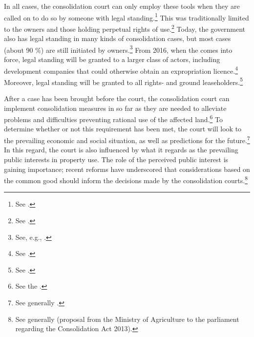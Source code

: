In all cases, the consolidation court can only employ these tools when they are called on to do so by someone with legal standing.\footnote{See \dni\cite[5]{lca79}.} This was traditionally limited to the owners and those holding perpetual rights of use.\footnote{See \dni\cite[5]{lca79}.} Today, the government also has legal standing in many kinds of consolidation cases, but most cases (about 90 \%) are still initiated by owners.\footnote{See, e.g., \cite[135]{bjerva12}.} From 2016, when the \cite{lca13} comes into force, legal standing will be granted to a larger class of actors, including development companies that could otherwise obtain an expropriation licence.\footnote{See \dni\cite[1-5(3)]{lca13}.} Moreover, legal standing will be granted to all rights- and ground leaseholders.\footnote{See \dni\cite[1-5(1)]{lca13}.}

After a case has been brought before the court, the consolidation court can implement consolidation measures in so far as they are needed to alleviate problems and difficulties preventing rational use of the affected land.\footnote{See the \dni\cite[1]{lca79}.} To determine whether or not this requirement has been met, the court will look to the prevailing economic and social situation, as well as predictions for the future.\footnote{See generally \cite{reiten09}.} In this regard, the court is also influenced by what it regards as the prevailing public interests in property use. The role of the perceived public interest is gaining importance; recent reforms have underscored that considerations based on the common good should inform the decisions made by the consolidation courts.\footnote{See generally \cite{prop12} (proposal from the Ministry of Agriculture to the parliament regarding the Consolidation Act 2013).}



